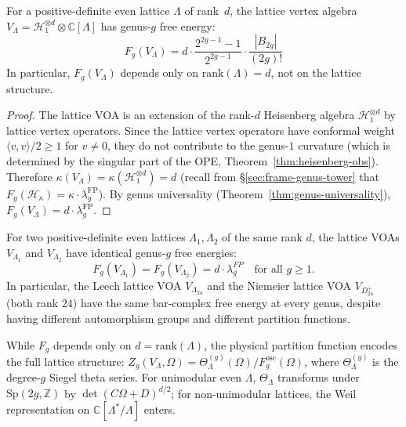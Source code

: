 \begin{theorem}\label{thm:lattice-all-genera}
For a positive-definite even lattice $\Lambda$ of
rank~$d$, the lattice vertex algebra
$V_\Lambda = \mathcal{H}_1^{\otimes d} \otimes
\mathbb{C}[\Lambda]$
has genus-$g$ free energy:
\begin{equation}\label{eq:lattice-Fg}
F_g(V_\Lambda) = d \cdot
\frac{2^{2g-1}-1}{2^{2g-1}} \cdot
\frac{|B_{2g}|}{(2g)!}
\end{equation}
In particular, $F_g(V_\Lambda)$ depends only on
$\mathrm{rank}(\Lambda) = d$, not on the lattice
structure.
\end{theorem}

\begin{proof}
The lattice VOA is an extension of the rank-$d$
Heisenberg algebra $\mathcal{H}_1^{\otimes d}$ by
lattice vertex operators.  Since the lattice vertex
operators have conformal weight $\langle v, v
\rangle / 2 \geq 1$ for $v \neq 0$, they do not
contribute to the genus-$1$ curvature (which is
determined by the singular part of the OPE,
Theorem~\ref{thm:heisenberg-obs}).
Therefore $\kappa(V_\Lambda) =
\kappa(\mathcal{H}_1^{\otimes d}) = d$
(recall from \S\ref{sec:frame-genus-tower} that
$F_g(\mathcal{H}_\kappa) = \kappa \cdot \lambda_g^{\mathrm{FP}}$).
By genus universality
(Theorem~\ref{thm:genus-universality}),
$F_g(V_\Lambda) = d \cdot \lambda_g^{\mathrm{FP}}$.
\end{proof}

\begin{corollary}
\label{cor:lattice-rank-only}
For two positive-definite even lattices $\Lambda_1, \Lambda_2$ of the same rank $d$, the lattice VOAs $V_{\Lambda_1}$ and $V_{\Lambda_2}$ have identical genus-$g$ free energies:
\[
F_g(V_{\Lambda_1}) = F_g(V_{\Lambda_2}) = d \cdot \lambda_g^{FP}
\quad \text{for all } g \geq 1.
\]
In particular, the Leech lattice VOA $V_{\Lambda_{24}}$ and the Niemeier lattice VOA $V_{D_{24}^+}$ (both rank $24$) have the same bar-complex free energy at every genus, despite having different automorphism groups and different partition functions.
\end{corollary}

\begin{remark}
\label{rem:lattice-partition-vs-free}
While $F_g$ depends only on $d = \mathrm{rank}(\Lambda)$, the physical partition function encodes the full lattice structure: $Z_g(V_\Lambda, \Omega) = \Theta_\Lambda^{(g)}(\Omega)/F_g^{\mathrm{osc}}(\Omega)$, where $\Theta_\Lambda^{(g)}$ is the degree-$g$ Siegel theta series.  For unimodular even $\Lambda$, $\Theta_\Lambda$ transforms under $\mathrm{Sp}(2g, \mathbb{Z})$ by $\det(C\Omega + D)^{d/2}$; for non-unimodular lattices, the Weil representation on $\mathbb{C}[\Lambda^*/\Lambda]$ enters.
\end{remark}

